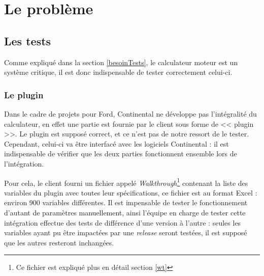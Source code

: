 \chapter{Le problème} \label{chapPb}
	\section{Les tests} \label{pbTests}
	Comme expliqué dans la section \ref{besoinTests}, le calculateur moteur est un système critique, il est donc indispensable de tester correctement celui-ci.

	\subsection{Le plugin}
	Dans le cadre de projets pour Ford, Continental ne développe pas l'intégralité du calculateur, en effet une partie est fournie par le client sous forme de << plugin >>. Le plugin est supposé correct, et ce n'est pas de notre ressort de le tester. Cependant, celui-ci va être interfacé avec les logiciels Continental : il est indispensable de vérifier que les deux parties fonctionnent ensemble lors de l'intégration.

	Pour cela, le client fourni un fichier appelé \textit{Walkthrough}\footnote{Ce fichier est expliqué plus en détail section \ref{wt}} contenant la liste des variables du plugin avec toutes leur spécifications, ce fichier est au format Excel : environ 900 variables différentes. Il est impensable de tester le fonctionnement d'autant de paramètres manuellement, ainsi l'équipe en charge de tester cette intégration effectue des tests de différence d'une version à l'autre : seules les variables ayant pu être impactées par une \textit{release} seront testées, il est supposé que les autres resteront inchangées.

